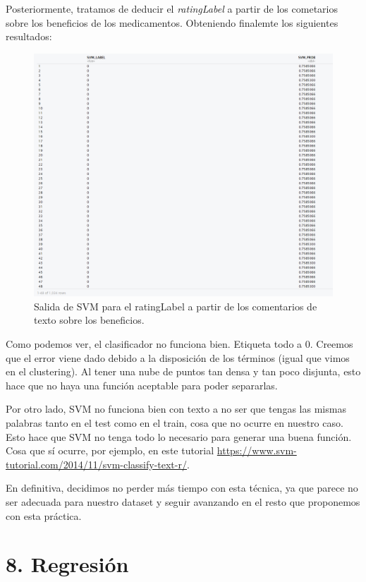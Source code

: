 \documentclass[spanish,]{article}
\begin{document}
Posteriormente, tratamos de deducir el \emph{ratingLabel} a partir de
los cometarios sobre los beneficios de los medicamentos. Obteniendo
finalemte los siguientes resultados:

\begin{figure}[h]
    \centering
    \includegraphics[width=1\textwidth]{figuras/svm/resultado.png}
    \caption{Salida de SVM para el ratingLabel a partir de los comentarios de texto sobre los beneficios.}
    \label{fig:svm:resultados}
\end{figure}

Como podemos ver, el clasificador no funciona bien. Etiqueta todo a 0.
Creemos que el error viene dado debido a la disposición de los términos
(igual que vimos en el clustering). Al tener una nube de puntos tan
densa y tan poco disjunta, esto hace que no haya una función aceptable
para poder separarlas.

Por otro lado, SVM no funciona bien con texto a no ser que tengas las
mismas palabras tanto en el test como en el train, cosa que no ocurre en
nuestro caso. Esto hace que SVM no tenga todo lo necesario para generar
una buena función. Cosa que sí ocurre, por ejemplo, en este tutorial
\url{https://www.svm-tutorial.com/2014/11/svm-classify-text-r/}.

En definitiva, decidimos no perder más tiempo con esta técnica, ya que
parece no ser adecuada para nuestro dataset y seguir avanzando en el
resto que proponemos con esta práctica.

\newpage

\section{8. Regresión}\label{regresion}
\end{document}
